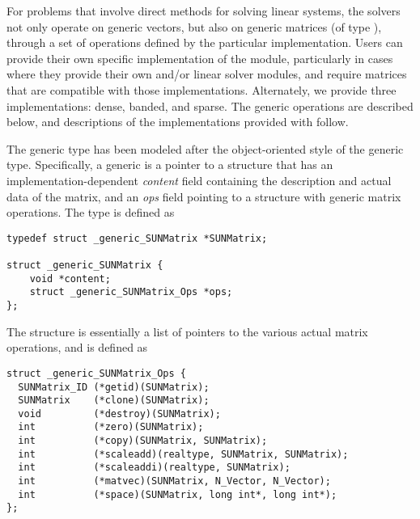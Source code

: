 %
For problems that involve direct methods for solving linear systems,
the {\sundials} solvers not only operate on generic vectors, but also 
on generic matrices (of type ), through a set of
operations defined by the particular {\sunmatrix} implementation.
Users can provide their own specific implementation of the
{\sunmatrix} module, particularly in cases where they provide their
own {\nvector} and/or linear solver modules, and require matrices that
are compatible with those implementations.  Alternately, we provide three
{\sunmatrix} implementations: dense, banded, and sparse.  The
generic operations are described below, and descriptions of the
implementations provided with {\sundials} follow.

The generic  type has been modeled after the
object-oriented style of the generic  type.
Specifically, a generic  is a pointer to a structure
that has an implementation-dependent {\em content} field containing
the description and actual data of the matrix, and an {\em ops} field 
pointing to a structure with generic matrix operations.
The type  is defined as
\begin{verbatim}
typedef struct _generic_SUNMatrix *SUNMatrix;

struct _generic_SUNMatrix {
    void *content;
    struct _generic_SUNMatrix_Ops *ops;
};
\end{verbatim}
The  structure is essentially a list of pointers to
the various actual matrix operations, and is defined as
\begin{verbatim}
struct _generic_SUNMatrix_Ops {
  SUNMatrix_ID (*getid)(SUNMatrix);
  SUNMatrix    (*clone)(SUNMatrix);
  void         (*destroy)(SUNMatrix);
  int          (*zero)(SUNMatrix);
  int          (*copy)(SUNMatrix, SUNMatrix);
  int          (*scaleadd)(realtype, SUNMatrix, SUNMatrix);
  int          (*scaleaddi)(realtype, SUNMatrix);
  int          (*matvec)(SUNMatrix, N_Vector, N_Vector);
  int          (*space)(SUNMatrix, long int*, long int*);
};
\end{verbatim}





